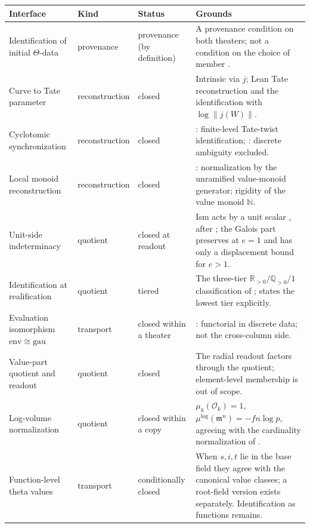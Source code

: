 \documentclass[11pt]{article}
\theoremstyle{plain}
\theoremstyle{definition}
\theoremstyle{remark}
\newcommand{\cO}{\mathcal O}
\begin{document}
\begin{center}
\small
\begin{longtable}{>{\raggedright\arraybackslash}p{2.9cm}>{\raggedright\arraybackslash}p{2.0cm}>{\raggedright\arraybackslash}p{1.9cm}>{\raggedright\arraybackslash}p{6.2cm}}
\toprule
Interface & Kind & Status & Grounds\\
\midrule
\endhead
Identification of initial $\Theta$-data & provenance & provenance
(by definition) & A provenance condition on both theaters; not a
condition on the choice of member \cite[Def.~3.8(ii)]{IUT3}.\\
Curve to Tate parameter & reconstruction & closed & Intrinsic via
$j$; Lean Tate reconstruction and the identification with
$\log\lVert j(W)\rVert$.\\
Cyclotomic synchronization & reconstruction & closed &
\cite[Cor.~2.19(i)]{EtTh}: finite-level Tate-twist identification;
\cite[Cor.~2.19(ii)]{EtTh}: discrete ambiguity excluded.\\
Local monoid reconstruction & reconstruction & closed &
\cite[Prop.~3.2]{AbsTopIII}: normalization by the unramified
value-monoid generator; rigidity of the value monoid $\mathbb N$.\\
Unit-side indeterminacy & quotient & closed at readout & Ism acts
by a unit scalar \cite[Prop.~9]{U4}, after \cite[Thm.~F,
Thm.~7.4]{MT}; the Galois part preserves at $e=1$ and has only a
displacement bound for $e>1$.\\
Identification at realification & quotient & tiered & The
three-tier $\mathbb R_{>0}/\mathbb Q_{>0}/1$ classification of
\cite[Thm.~6.4]{FrdI}; \cite[Cor.~4.10(v)]{IUT2} states the lowest
tier explicitly.\\
Evaluation isomorphism $\mathrm{env}\cong\mathrm{gau}$ & transport &
closed within a theater & \cite[Cor.~4.5(v), Cor.~4.6(iv)(v)]{IUT2}:
functorial in discrete data; not the cross-column side.\\
Value-part quotient and readout & quotient & closed & The radial
readout factors through the quotient; element-level membership is
out of scope.\\
Log-volume normalization & quotient & closed within a copy &
$\mu_k(\cO_k)=1$, $\mu^{\log}(\mathfrak m^n)=-fn\log p$, agreeing
with the cardinality normalization of \cite[Ex.~6.3]{FrdI}.\\
Function-level theta values & transport & conditionally closed &
When $s,i,t$ lie in the base field they agree with the canonical
value classes; a root-field version exists separately.
Identification as functions remains.\\

\end{longtable}
\end{center}
\end{document}
